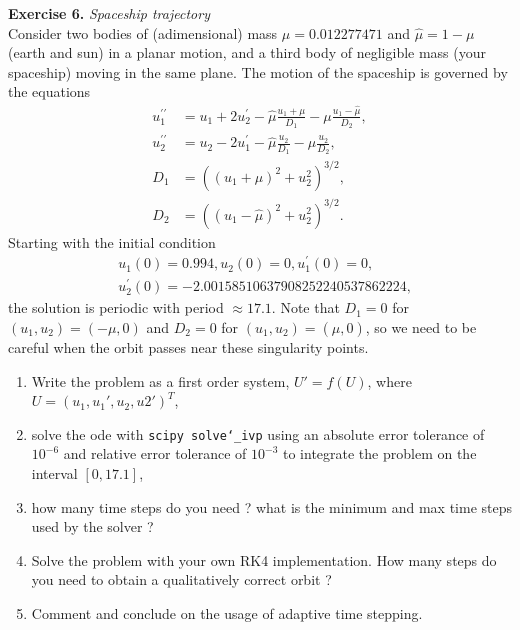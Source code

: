 \documentclass{article}
\begin{document}
\vspace{0.5cm}
\noindent \textbf{Exercise 6.} \textit{Spaceship trajectory}  \\
Consider two bodies of (adimensional) mass $\mu = 0.012277471$ and $\hat{\mu} = 1 - \mu$ (earth and sun) in a planar motion, and a third body of negligible mass (your spaceship) moving in the same plane. The motion of the spaceship is governed by the equations
\begin{align*}
u_1^{\prime \prime} & =u_1+2 u_2^{\prime}-\hat{\mu} \frac{u_1+\mu}{D_1}-\mu \frac{u_1-\hat{\mu}}{D_2}, \\
u_2^{\prime \prime} & =u_2-2 u_1^{\prime}-\hat{\mu} \frac{u_2}{D_1}-\mu \frac{u_2}{D_2}, \\
D_1 & =\left(\left(u_1+\mu\right)^2+u_2^2\right)^{3 / 2}, \\
D_2 & =\left(\left(u_1-\hat{\mu}\right)^2+u_2^2\right)^{3 / 2} .
\end{align*}
Starting with the initial condition
\begin{align*}
& u_1(0)=0.994, u_2(0)=0, u_1^{\prime}(0)=0, \\
& u_2^{\prime}(0)=-2.00158510637908252240537862224,
\end{align*}
the solution is periodic with period $\approx 17.1$. Note that $D_1 = 0$ for $(u_1, u_2) = (-\mu,0)$ and $D_2 = 0$ for $(u_1, u_2) = (\hat{\mu},0)$, so we need to be careful when the orbit passes near these singularity points.
\begin{enumerate}
    \item Write the problem as a first order system, $U' = f(U)$, where $U =(u_1,u_1',u_2,u2')^T$,
    \item solve the ode with \texttt{scipy solve\char`_ivp} using an absolute error tolerance of $10^{-6}$ and relative error tolerance of $10^{-3}$ to integrate the problem on the interval
    $[0,17.1]$,
    \item how many time steps do you need ? what is the minimum and max time steps used by the solver ?
    \item Solve the problem with your own RK4 implementation. How many steps do you need to obtain a qualitatively correct orbit ?
    \item Comment and conclude on the usage of adaptive time stepping.
\end{enumerate}
\end{document}
